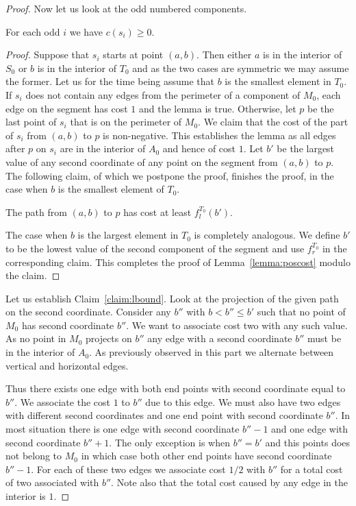 \documentclass{theoretics}
\begin{document}
\begin{proof}
Now let us look at the odd numbered components.
\begin{lemma}\label{lemma:poscost}
For each odd $i$ we have $c(s_i) \geq  0$.
\end{lemma}

\begin{proof}
Suppose that $s_i$
starts at point $(a,b)$.  Then either $a$ is in the interior
of $S_0$ or $b$ is in the interior of $T_0$ and as the two 
cases are symmetric we may assume the former.
Let us for the time being assume that $b$ is the smallest
element in $T_0$.   If $s_i$
does not contain any edges from the perimeter of a
component of $M_0$, each edge on the segment has
cost $1$ and the lemma is true.  Otherwise, let $p$ be the last
point of $s_i$ that is on the perimeter of $M_0$.   We claim that the
cost of the part of $s_i$ from $(a,b)$ to $p$ is non-negative.
This establishes the lemma as all
edges after $p$ on $s_i$ are in the interior of $A_0$ and
hence of cost $1$.
Let $b'$ be the largest value of any second coordinate 
of any point on
the segment from $(a,b)$ to $p$.  The following
claim, of which we postpone the proof, finishes the proof,
in the case when $b$ is the smallest element of $T_0$.
\begin{claim}\label{claim:lbound}
The path from $(a,b)$ to $p$ has cost at least $f_l^{T_0} (b')$.
\end{claim}
The case when $b$ is the largest element in $T_0$ is completely
analogous.  We define $b'$ to be the lowest value of the
second component of the segment and use $f_r^{T_0}$ 
in the corresponding claim.  This completes the proof
of Lemma~\ref{lemma:poscost} modulo the claim.
\end{proof}

Let us establish Claim~\ref{claim:lbound}.  Look at the projection
of the given path on the second coordinate.  Consider any $b''$
with $b <b'' \leq b'$ such that no point of $M_0$ has second
coordinate $b''$.  We want to associate cost two with any
such value.
As no point in $M_0$ projects on $b''$ any edge with
a second coordinate $b''$ must be in the interior of $A_0$.
As previously observed in this part we alternate
between vertical and horizontal edges.

Thus there exists one edge with both end points with
second coordinate equal to $b''$.  We associate the
cost $1$ to $b''$ due to this edge.  We must also have
two edges with different second coordinates
and one end point with second coordinate $b''$.
In most situation there is one edge with second coordinate
$b''-1$ and one edge with second coordinate $b''+1$.
The only exception is when $b''=b'$ and this points
does not belong to $M_0$ in which case both other
end points have second coordinate $b''-1$.
For each of these two edges we associate cost $1/2$ with
$b''$ for a total cost of two associated with   $b''$.
Note also that the total cost caused by any edge
in the interior is $1$.


\end{proof}
\end{document}
